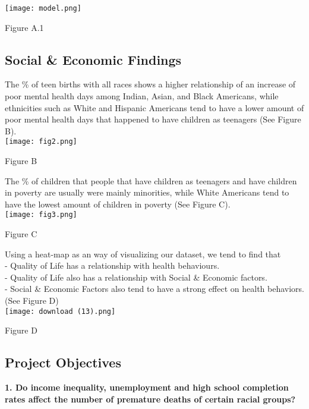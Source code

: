 \documentclass[conference]{IEEEtran}
\begin{document}
\texttt{[image: model.png]}
\begin{center}
\footnotesize{Figure A.1}    
\end{center}


\subsection{Social \& Economic Findings}

The \% of teen births with all races shows a higher relationship of an increase of poor mental health days among Indian,
Asian, and Black Americans, while ethnicities such as White
and Hispanic Americans tend to have a lower amount of
poor mental health days that happened to have children as
teenagers (See Figure B).\\

\texttt{[image: fig2.png]}
\begin{center}
\footnotesize{Figure B}    
\end{center}

The \% of children that people that have children as teenagers
and have children in poverty are usually were mainly minorities, while White Americans tend to have the lowest amount
of children in poverty (See Figure C).\\
\texttt{[image: fig3.png]}
\begin{center}
\footnotesize{Figure C}    
\end{center}


Using a heat-map as an way of visualizing our dataset,
we tend to find that\\
- Quality of Life has a relationship with health behaviours.\\
- Quality of Life also has a relationship with Social & Economic factors.\\
- Social & Economic Factors also tend to have a strong effect on health behaviors.\\
(See Figure D)\\

\texttt{[image: download (13).png]}
\begin{center}
\footnotesize{Figure D}    
\end{center}


\subsection{Project Objectives}
\textbf{1. Do income inequality, unemployment and high school
completion
rates affect the number of premature deaths of certain racial
groups?}\\
\end{document}

